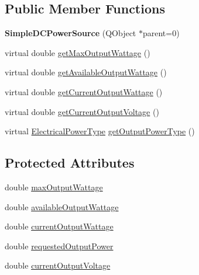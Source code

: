 \subsection*{Public Member Functions}
\begin{DoxyCompactItemize}
\item 
\hypertarget{class_challenger604_systems_1_1_simple_d_c_power_source_a874e451053b69d48b2bbdf924ce05dde}{{\bfseries Simple\-D\-C\-Power\-Source} (Q\-Object $\ast$parent=0)}\label{class_challenger604_systems_1_1_simple_d_c_power_source_a874e451053b69d48b2bbdf924ce05dde}

\item 
virtual double \hyperlink{class_challenger604_systems_1_1_simple_d_c_power_source_a9cdf826d67e23a54371a6d7840fd5ff9}{get\-Max\-Output\-Wattage} ()
\item 
virtual double \hyperlink{class_challenger604_systems_1_1_simple_d_c_power_source_adb43f9aa9dba70e75d2fab1efcafc98f}{get\-Available\-Output\-Wattage} ()
\item 
virtual double \hyperlink{class_challenger604_systems_1_1_simple_d_c_power_source_a6e35b8636ae955ce4b46f14e3b864650}{get\-Current\-Output\-Wattage} ()
\item 
virtual double \hyperlink{class_challenger604_systems_1_1_simple_d_c_power_source_a744f905531f1876b3d66200d78e0ba56}{get\-Current\-Output\-Voltage} ()
\item 
virtual \hyperlink{namespace_challenger604_systems_a9ad1a793d94b97514092692cb7315afd}{Electrical\-Power\-Type} \hyperlink{class_challenger604_systems_1_1_simple_d_c_power_source_a9253b83cb9e35b40db473e24bf3d7f54}{get\-Output\-Power\-Type} ()
\end{DoxyCompactItemize}
\subsection*{Protected Attributes}
\begin{DoxyCompactItemize}
\item 
double \hyperlink{class_challenger604_systems_1_1_simple_d_c_power_source_a47660a2b69c6c426bf4cf684de7b8f52}{max\-Output\-Wattage}
\item 
double \hyperlink{class_challenger604_systems_1_1_simple_d_c_power_source_af174a8c75a7d5e3d07332708802bf658}{available\-Output\-Wattage}
\item 
double \hyperlink{class_challenger604_systems_1_1_simple_d_c_power_source_adb91207a44984ac09b34118d3b1157b8}{current\-Output\-Wattage}
\item 
double \hyperlink{class_challenger604_systems_1_1_simple_d_c_power_source_a44427ce8f77ab04a8f2fc0cd17e7e936}{requested\-Output\-Power}
\item 
double \hyperlink{class_challenger604_systems_1_1_simple_d_c_power_source_a9f5aa415f92d0a050db0c92fe9f98c1d}{current\-Output\-Voltage}
\end{DoxyCompactItemize}


